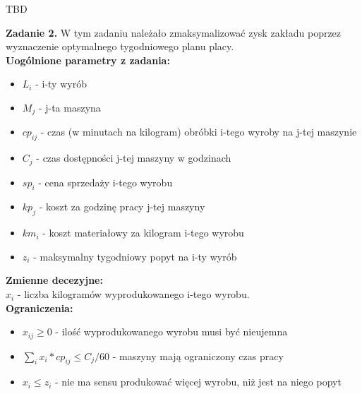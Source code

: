 \documentclass[15pt, a4paper]{article}
\begin{document}
TBD

\vspace{0.5cm}

\noindent\hrulefill

\vspace{0.5cm}


\noindent\textbf{Zadanie 2.} W tym zadaniu należało zmaksymalizować zysk zakładu poprzez wyznaczenie optymalnego tygodniowego planu placy.\\

\noindent\textbf{Uogólnione parametry z zadania:}

\begin{itemize}
    \item \( L_i \) - i-ty wyrób
    \item \( M_j \) - j-ta maszyna
    \item \( cp_{ij} \) - czas (w minutach na kilogram) obróbki i-tego wyroby na j-tej maszynie
    \item \( C_j \) - czas dostępności j-tej maszyny w godzinach
    \item \( sp_i \) - cena sprzedaży i-tego wyrobu
    \item \( kp_j \) - koszt za godzinę pracy j-tej maszyny
    \item \( km_{i} \) - koszt materiałowy za kilogram i-tego wyrobu
    \item \( z_{i} \) - maksymalny tygodniowy popyt na i-ty wyrób
\end{itemize}

\noindent\textbf{Zmienne decezyjne:}\\

\(x_{i}\) - liczba kilogramów wyprodukowanego i-tego wyrobu.\\

\noindent\textbf{Ograniczenia:}


\begin{itemize}
    \item \(x_{ij} \geq 0 \) - ilość wyprodukowanego wyrobu musi być nieujemna
    \item \(\sum_{i}x_{i} * cp_{ij} \leq C_j / 60\)  - maszyny mają ograniczony czas pracy 
    \item \(x_{i} \leq z_i \) - nie ma sensu produkować więcej wyrobu, niż jest na niego popyt 
\end{itemize}
\end{document}
